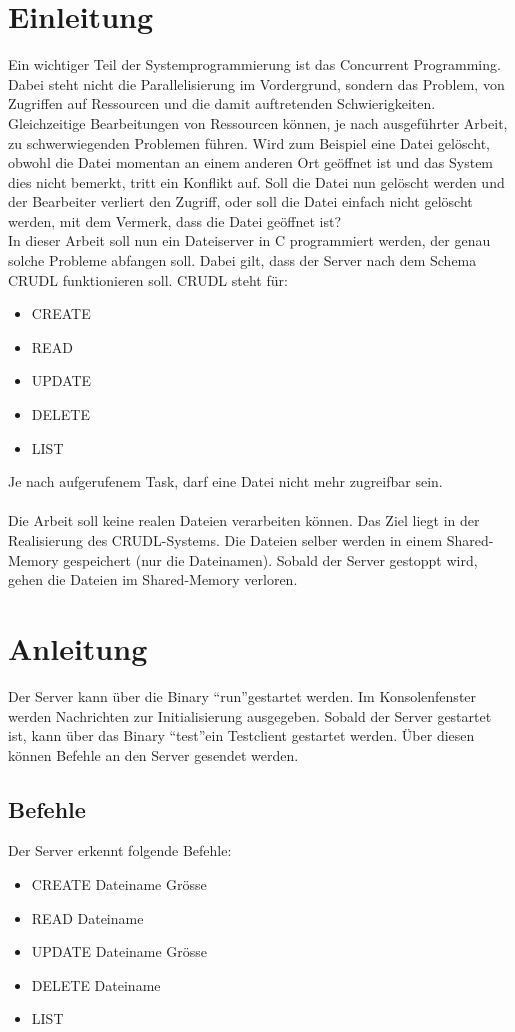 \documentclass[12pt,a4paper,ngerman]{report}
\begin{document}
\chapter*{Einleitung}
Ein wichtiger Teil der Systemprogrammierung ist das Concurrent Programming. Dabei steht nicht die Parallelisierung im Vordergrund, sondern das Problem, von Zugriffen auf Ressourcen und die damit auftretenden Schwierigkeiten. Gleichzeitige Bearbeitungen von Ressourcen können, je nach ausgeführter Arbeit, zu schwerwiegenden Problemen führen. Wird zum Beispiel eine Datei gelöscht, obwohl die Datei momentan an einem anderen Ort geöffnet ist und das System dies nicht bemerkt, tritt ein Konflikt auf. Soll die Datei nun gelöscht werden und der Bearbeiter verliert den Zugriff, oder soll die Datei einfach nicht gelöscht werden, mit dem Vermerk, dass die Datei geöffnet ist?
\\
In dieser Arbeit soll nun ein Dateiserver in C programmiert werden, der genau solche Probleme abfangen soll. Dabei gilt, dass der Server nach dem Schema CRUDL funktionieren soll. CRUDL steht für:
\begin{itemize}
	\item CREATE
	\item READ
	\item UPDATE
	\item DELETE
	\item LIST
\end{itemize}
Je nach aufgerufenem Task, darf eine Datei nicht mehr zugreifbar sein.
\\
\\
Die Arbeit soll keine realen Dateien verarbeiten können. Das Ziel liegt in der Realisierung des CRUDL-Systems. Die Dateien selber werden in einem Shared-Memory gespeichert (nur die Dateinamen). Sobald der Server gestoppt wird, gehen die Dateien im Shared-Memory verloren.
\chapter{Anleitung}
Der Server kann über die Binary \textquotedblleft run\textquotedblright gestartet werden. Im Konsolenfenster werden Nachrichten zur Initialisierung ausgegeben. Sobald der Server gestartet ist, kann über das Binary \textquotedblleft test\textquotedblright ein Testclient gestartet werden. Über diesen können Befehle an den Server gesendet werden.
\section{Befehle}
Der Server erkennt folgende Befehle:
\begin{itemize}
	\item CREATE Dateiname Grösse
	\item READ Dateiname
	\item UPDATE Dateiname Grösse
	\item DELETE Dateiname
	\item LIST
\end{itemize}
\end{document}
